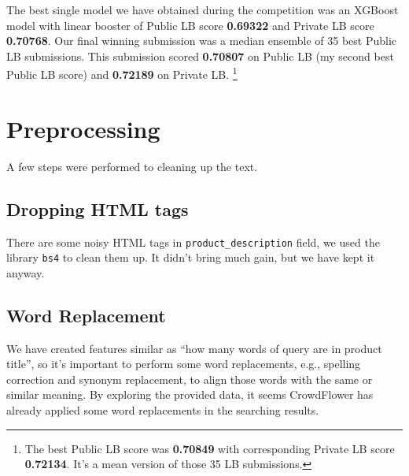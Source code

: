\documentclass[12pt]{article}
\begin{document}
The best single model we have obtained during the competition was an XGBoost model with linear booster of Public LB score \textbf{0.69322} and Private LB score \textbf{0.70768}. Our final winning submission was a median ensemble of 35 best Public LB submissions. This submission scored \textbf{0.70807} on Public LB (my second best Public LB score) and \textbf{0.72189} on Private LB. \footnote{The best Public LB score was \textbf{0.70849} with corresponding Private LB score \textbf{0.72134}. It's a mean version of those 35 LB submissions.}

\begin{comment}
\begin{figure}[!htb]
\centering
\begin{tikzpicture}
\draw (-1.5,0) -- (1.5,0);
\draw (0,-1.5) -- (0,1.5);
\end{tikzpicture}
\end{figure}
\end{comment}

\section{Preprocessing}
A few steps were performed to cleaning up the text.
\subsection{Dropping HTML tags}
There are some noisy HTML tags in \texttt{product\_description} field, we used the library \texttt{bs4} to clean them up. It didn't bring much gain, but we have kept it anyway.

\subsection{Word Replacement}
We have created features similar as ``how many words of query are in product title'', so it's important to perform some word replacements, e.g., spelling correction and synonym replacement, to align those words with the same or similar meaning. By exploring the provided data, it seems CrowdFlower has already applied some word replacements in the searching results.
\end{document}
